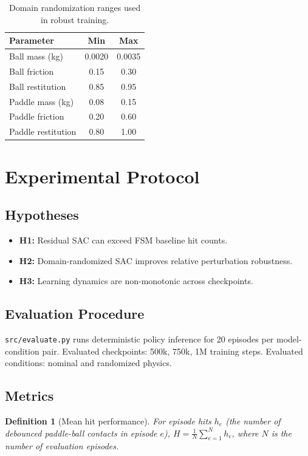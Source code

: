 \documentclass[10pt,twocolumn,letterpaper]{article}
\newtheorem{definition}{Definition}
\begin{document}
\begin{table}[t]
\centering
\caption{Domain randomization ranges used in robust training.}
\label{tab:dr_ranges}
\small
\begin{tabular}{lcc}
\toprule
Parameter & Min & Max \\
\midrule
Ball mass (kg) & 0.0020 & 0.0035 \\
Ball friction & 0.15 & 0.30 \\
Ball restitution & 0.85 & 0.95 \\
Paddle mass (kg) & 0.08 & 0.15 \\
Paddle friction & 0.20 & 0.60 \\
Paddle restitution & 0.80 & 1.00 \\
\bottomrule
\end{tabular}
\end{table}

\section{Experimental Protocol}
\subsection{Hypotheses}
\begin{itemize}[leftmargin=*,noitemsep]
    \item \textbf{H1:} Residual SAC can exceed FSM baseline hit counts.
    \item \textbf{H2:} Domain-randomized SAC improves relative perturbation robustness.
    \item \textbf{H3:} Learning dynamics are non-monotonic across checkpoints.
\end{itemize}

\subsection{Evaluation Procedure}
\texttt{src/evaluate.py} runs deterministic policy inference for 20 episodes per model-condition pair.
Evaluated checkpoints: 500k, 750k, 1M training steps.
Evaluated conditions: nominal and randomized physics.

\subsection{Metrics}
\begin{definition}[Mean hit performance]
For episode hits $h_e$ (the number of debounced paddle-ball contacts in episode $e$), $H=\frac{1}{N}\sum_{e=1}^{N}h_e$, where $N$ is the number of evaluation episodes.
\end{definition}
\end{document}
